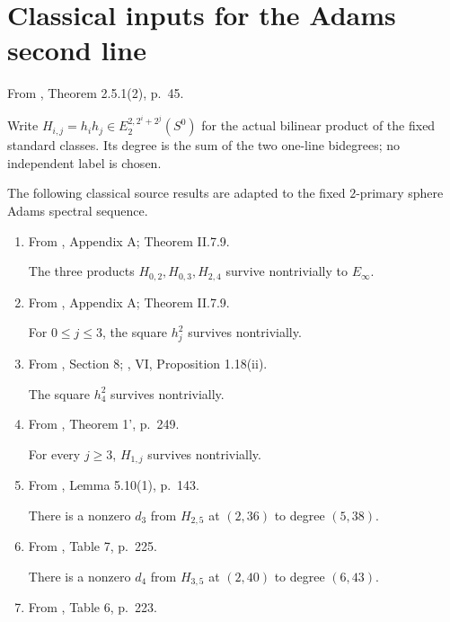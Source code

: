 \section{Classical inputs for the Adams second line}
\begin{definition}
\label{sem:Literature:two-line-products}
From \cite{Adams60}, Theorem 2.5.1(2), p.~45.\par

Write $H_{i,j}=h_i h_j\in E_2^{2,2^i+2^j}(S^0)$ for the actual bilinear product of the fixed standard classes. Its degree is the sum of the two one-line bidegrees; no independent label is chosen.
\end{definition}

\begin{theorem}
\label{sem:Literature:two-line-classical-inputs}
The following classical source results are adapted to the fixed $2$-primary sphere Adams spectral sequence.
\begin{enumerate}
\item From \cite{MayThesis1964}, Appendix A; Theorem II.7.9.\par

The three products $H_{0,2},H_{0,3},H_{2,4}$ survive nontrivially to $E_\infty$.
\item From \cite{MayThesis1964}, Appendix A; Theorem II.7.9.\par

For $0\leq j\leq3$, the square $h_j^2$ survives nontrivially.
\item From \cite{MahowaldTangora}, Section 8; \cite{BMMS1986}, VI, Proposition 1.18(ii).\par

The square $h_4^2$ survives nontrivially.
\item From \cite{Mahowaldetaj}, Theorem 1', p.~249.\par

For every $j\geq3$, $H_{1,j}$ survives nontrivially.
\item From \cite{IWX}, Lemma 5.10(1), p.~143.\par

There is a nonzero $d_3$ from $H_{2,5}$ at $(2,36)$ to degree $(5,38)$.
\item From \cite{IWX}, Table 7, p.~225.\par

There is a nonzero $d_4$ from $H_{3,5}$ at $(2,40)$ to degree $(6,43)$.
\item From \cite{IWX}, Table 6, p.~223.\par


\end{enumerate}
\end{theorem}
